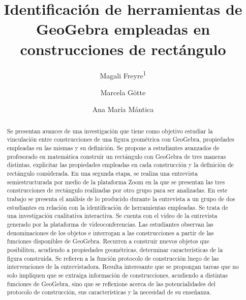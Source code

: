 \documentclass[oneside,spanish]{amsart}
\numberwithin{equation}{section}
\numberwithin{figure}{section}
\theoremstyle{definition}
\begin{document}
	
\title{Identificación de herramientas de GeoGebra empleadas en construcciones de rectángulo\vspace{-2ex}}
\author[1]{Magali Freyre\textsuperscript{1}}
\address[1]{Facultad de Humanidades y Ciencias, Universidad Nacional del Litoral}
\author[2]{Marcela Götte}
\author[3]{Ana María Mántica}

\begin{abstract}
	Se presentan avances de una investigación que tiene como objetivo estudiar la vinculación entre construcciones de una figura geométrica con GeoGebra, propiedades empleadas en las mismas y su definición. Se propone a estudiantes avanzados de profesorado en matemática construir un rectángulo con GeoGebra de tres maneras distintas, explicitar las propiedades empleadas en cada construcción y la definición de rectángulo considerada. En una segunda etapa, se realiza una entrevista semiestructurada por medio de la plataforma Zoom en la que se presentan las tres construcciones de rectángulo realizadas por otro grupo para ser analizadas. En este trabajo se presenta el análisis de lo producido durante la entrevista a un grupo de dos estudiantes en relación con la identificación de herramientas empleadas. Se trata de una investigación cualitativa interactiva. Se cuenta con el video de la entrevista generado por la plataforma de videoconferencias. Las estudiantes observan las denominaciones de los objetos e interrogan a las construcciones a partir de las funciones disponibles de GeoGebra. Recurren a construir nuevos objetos que posibiliten, acudiendo a propiedades geométricas, determinar características de la figura construida. Se refieren a la función protocolo de construcción luego de las intervenciones de la entrevistadora. Resulta interesante que se propongan tareas que no solo impliquen que se extraiga información de construcciones, acudiendo a distintas funciones de GeoGebra, sino que se reflexione acerca de las potencialidades del protocolo de construcción, sus características y la necesidad de su enseñanza.
\end{abstract}

\maketitle
\thispagestyle{empty}
\end{document}
